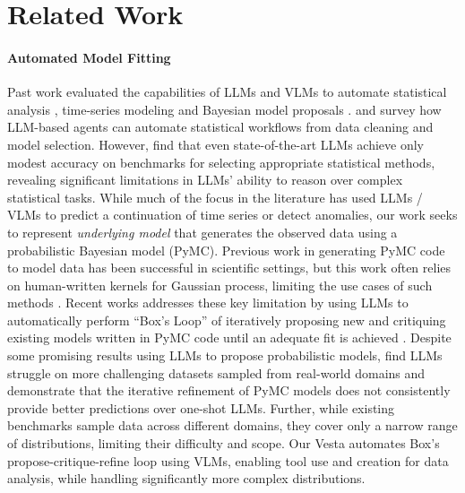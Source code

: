 \documentclass{article}
\newcommand{\method}{{\sc Vesta}}
\begin{document}
\section{Related Work}
\paragraph{Automated Model Fitting} Past work evaluated the capabilities of LLMs and VLMs to automate statistical analysis \citep{llm_statisticians, llm_stat_overview}, time-series modeling \citep{time_series_transformer, transformer_ts_survey, llm_zero_shot_ts, time_vlm, vlm_ts_survey} and Bayesian model proposals \citep{llm_processes, critical}. \citet{llm_stat_overview} and \citet{llm_statisticians} survey how LLM-based agents can automate statistical workflows from data cleaning and model selection. However, \citet{are_llms_good_statisticians} find that even state-of-the-art LLMs achieve only modest accuracy on benchmarks for selecting appropriate statistical methods, revealing significant limitations in LLMs' ability to reason over complex statistical tasks. While much of the focus in the literature has used LLMs / VLMs to predict a continuation of time series or detect anomalies, our work seeks to represent \textit{underlying model} that generates the observed data using a probabilistic Bayesian model (PyMC). Previous work in generating PyMC code to model data has been successful in scientific settings, but this work often relies on human-written kernels for Gaussian process, limiting the use cases of such methods \cite{amd_non_linear_dynamics, probabilistic_grammars, kernel_search}. Recent works addresses these key limitation by using LLMs to automatically perform ``Box's Loop'' of iteratively proposing new and critiquing existing models written in PyMC code until an adequate fit is achieved \cite{box_lm}. Despite some promising results using LLMs to propose probabilistic models, \citet{boxing_gym} find LLMs struggle on more challenging datasets sampled from real-world domains and demonstrate that the iterative refinement of PyMC models does not consistently provide better predictions over one-shot LLMs. Further, while existing benchmarks sample data across different domains, they cover only a narrow range of distributions, limiting their difficulty and scope. Our \method{} automates Box's propose-critique-refine loop using VLMs, enabling tool use and creation for data analysis, while handling significantly more complex distributions.
\end{document}
